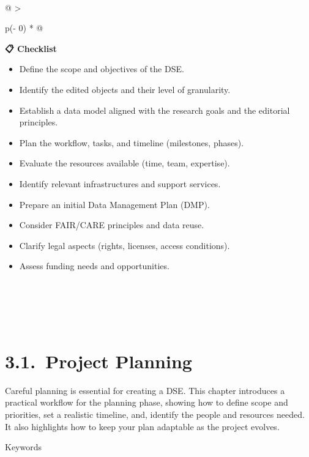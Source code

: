 \documentclass[
  letterpaper,
  DIV=11,
  numbers=noendperiod]{scrreprt}
\begin{document}
~

\begin{longtable}[]{@{}
  >{\raggedright\arraybackslash}p{(\columnwidth - 0\tabcolsep) * }@{}}
\toprule\noalign{}
\begin{minipage}[b]{\linewidth}\raggedright
\textbf{📋 Checklist}

\begin{itemize}
\item
  Define the scope and objectives of the DSE.
\item
  Identify the edited objects and their level of granularity.
\item
  Establish a data model aligned with the research goals and the
  editorial principles.
\item
  Plan the workflow, tasks, and timeline (milestones, phases).
\item
  Evaluate the resources available (time, team, expertise).
\item
  Identify relevant infrastructures and support services.
\item
  Prepare an initial Data Management Plan (DMP).
\item
  Consider FAIR/CARE principles and data reuse.
\item
  Clarify legal aspects (rights, licenses, access conditions).
\item
  Assess funding needs and opportunities.
\end{itemize}
\end{minipage} \\
\midrule\noalign{}
\endhead
\bottomrule\noalign{}
\endlastfoot
 \\
\end{longtable}

~~

\section*{3.1.~Project Planning}\label{project-planning}


Careful planning is essential for creating a DSE. This chapter
introduces a practical workflow for the planning phase, showing how to
define scope and priorities, set a realistic timeline, and, identify the
people and resources needed. It also highlights how to keep your plan
adaptable as the project evolves.

Keywords
\end{document}
